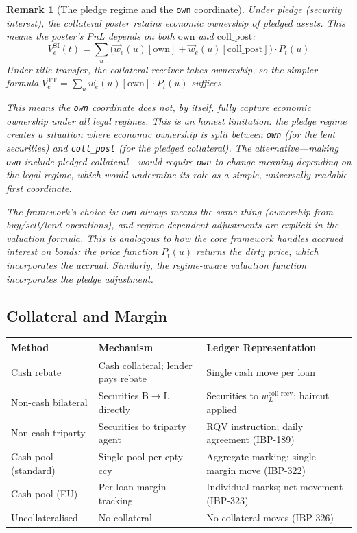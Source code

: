 \documentclass[11pt,a4paper]{article}
\newtheorem{remark}[definition]{Remark}
\begin{document}
\begin{remark}[The pledge regime and the \texttt{own} coordinate]
Under pledge (security interest), the collateral poster retains economic ownership of pledged assets. This means the poster's PnL depends on both $\mathrm{own}$ and $\mathrm{coll\_post}$:
\[
V_e^{\mathrm{SI}}(t) = \sum_u \bigl(\vec{w}_e(u)[\mathrm{own}] + \vec{w}_e(u)[\mathrm{coll\_post}]\bigr) \cdot P_t(u)
\]
Under title transfer, the collateral receiver takes ownership, so the simpler formula $V_e^{\mathrm{TT}} = \sum_u \vec{w}_e(u)[\mathrm{own}] \cdot P_t(u)$ suffices.

This means the \texttt{own} coordinate does not, by itself, fully capture economic ownership under all legal regimes. This is an honest limitation: the pledge regime creates a situation where economic ownership is split between \texttt{own} (for the lent securities) and \texttt{coll\_post} (for the pledged collateral). The alternative---making \texttt{own} include pledged collateral---would require \texttt{own} to change meaning depending on the legal regime, which would undermine its role as a simple, universally readable first coordinate.

The framework's choice is: \texttt{own} always means the same thing (ownership from buy/sell/lend operations), and regime-dependent adjustments are explicit in the valuation formula. This is analogous to how the core framework handles accrued interest on bonds: the price function $P_t(u)$ returns the dirty price, which incorporates the accrual. Similarly, the regime-aware valuation function incorporates the pledge adjustment.
\end{remark}

\subsection{Collateral and Margin}
\label{sec:sbl-collateral}

\begin{center}
\small
\begin{tabular}{l p{3.5cm} p{5cm}}
\toprule
\textbf{Method} & \textbf{Mechanism} & \textbf{Ledger Representation} \\
\midrule
Cash rebate & Cash collateral; lender pays rebate & Single cash move per loan \\
Non-cash bilateral & Securities B$\to$L directly & Securities to $w^{\mathrm{coll\text{-}recv}}_L$; haircut applied \\
Non-cash triparty & Securities to triparty agent & RQV instruction; daily agreement (IBP-189) \\
Cash pool (standard) & Single pool per cpty-ccy & Aggregate marking; single margin move (IBP-322) \\
Cash pool (EU) & Per-loan margin tracking & Individual marks; net movement (IBP-323) \\
Uncollateralised & No collateral & No collateral moves (IBP-326) \\
\bottomrule
\end{tabular}
\end{center}
\end{document}
